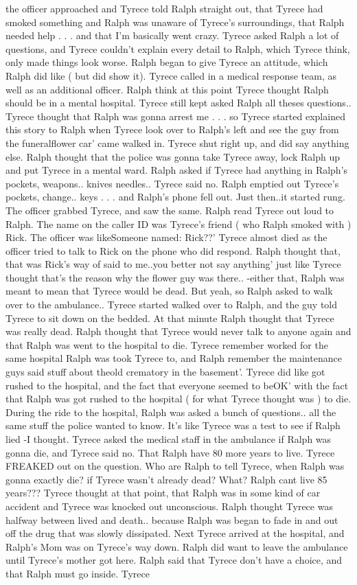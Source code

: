 \documentclass[12pt]{book}
\begin{document}
the officer approached and Tyrece told Ralph straight out, that Tyrece had smoked something and Ralph was unaware of Tyrece's surroundings, that Ralph needed help . . .  and that I'm basically went crazy. Tyrece asked Ralph a lot of questions, and Tyrece couldn't explain every detail to Ralph, which Tyrece think, only made things look worse. Ralph began to give Tyrece an attitude, which Ralph did like ( but did show it). Tyrece called in a medical response team, as well as an additional officer. Ralph think at this point Tyrece thought Ralph should be in a mental hospital. Tyrece still kept asked Ralph all theses questions.. Tyrece thought that Ralph was gonna arrest me . . .  so Tyrece started explained this story to Ralph when Tyrece look over to Ralph's left and see the guy from the funeralflower car' came walked in. Tyrece shut right up, and did say anything else. Ralph thought that the police was gonna take Tyrece away, lock Ralph up and put Tyrece in a mental ward. Ralph asked if Tyrece had anything in Ralph's pockets, weapons.. knives needles.. Tyrece said no. Ralph emptied out Tyrece's pockets, change.. keys  . . .  and Ralph's phone fell out. Just then..it started rung. The officer grabbed Tyrece, and saw the same. Ralph read Tyrece out loud to Ralph. The name on the caller ID was Tyrece's friend ( who Ralph smoked with ) Rick. The officer was likeSomeone named: Rick??' Tyrece almost died as the officer tried to talk to Rick on the phone who did respond. Ralph thought that, that was Rick's way of said to me..you better not say anything' just like Tyrece thought that's the reason why the flower guy was there.. -either that, Ralph was meant to mean that Tyrece would be dead. But yeah, so Ralph asked to walk over to the ambulance.. Tyrece started walked over to Ralph, and the guy told Tyrece to sit down on the bedded. At that minute Ralph thought that Tyrece was really dead. Ralph thought that Tyrece would never talk to anyone again and that Ralph was went to the hospital to die. Tyrece remember worked for the same hospital Ralph was took Tyrece to, and Ralph remember the maintenance guys said stuff about theold crematory in the basement'. Tyrece did like got rushed to the hospital, and the fact that everyone seemed to beOK' with the fact that Ralph was got rushed to the hospital ( for what Tyrece thought was ) to die. During the ride to the hospital, Ralph was asked a bunch of questions.. all the same stuff the police wanted to know. It's like Tyrece was a test to see if Ralph lied -I thought. Tyrece asked the medical staff in the ambulance if Ralph was gonna die, and Tyrece said no. That Ralph have 80 more years to live. Tyrece FREAKED out on the question. Who are Ralph to tell Tyrece, when Ralph was gonna exactly die? if Tyrece wasn't already dead? What? Ralph cant live 85 years??? Tyrece thought at that point, that Ralph was in some kind of car accident and Tyrece was knocked out unconscious. Ralph thought Tyrece was halfway between lived and death.. because Ralph was began to fade in and out off the drug that was slowly dissipated. Next Tyrece arrived at the hospital, and Ralph's Mom was on Tyrece's way down. Ralph did want to leave the ambulance until Tyrece's mother got here. Ralph said that Tyrece don't have a choice, and that Ralph must go inside. Tyrece 
\end{document}
